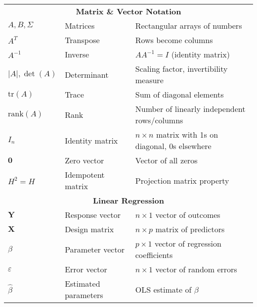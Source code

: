 \documentclass[10pt]{article}
\newcommand{\vect}[1]{\symbf{#1}} %
\begin{document}
\begin{center}
\begin{tabular}{l l l}
    \midrule
    \multicolumn{3}{c}{\textbf{Matrix \& Vector Notation}}                                                                \\
    $A, B, \Sigma$             & Matrices                       & Rectangular arrays of numbers                           \\
    $A^T$                      & Transpose                      & Rows become columns                                     \\
    $A^{-1}$                   & Inverse                        & $AA^{-1} = I$ (identity matrix)                         \\
    $|A|, \det(A)$             & Determinant                    & Scaling factor, invertibility measure                   \\
    $\text{tr}(A)$             & Trace                          & Sum of diagonal elements                                \\
    $\text{rank}(A)$           & Rank                           & Number of linearly independent rows/columns             \\
    $I_n$                      & Identity matrix                & $n \times n$ matrix with 1s on diagonal, 0s elsewhere   \\
    $\vect{0}$                 & Zero vector                    & Vector of all zeros                                     \\
    $H^2 = H$                  & Idempotent matrix              & Projection matrix property                              \\
    \midrule
    \multicolumn{3}{c}{\textbf{Linear Regression}}                                                                        \\
    $\vect{Y}$                 & Response vector                & $n \times 1$ vector of outcomes                         \\
    $\vect{X}$                 & Design matrix                  & $n \times p$ matrix of predictors                       \\
    $\beta$                    & Parameter vector               & $p \times 1$ vector of regression coefficients          \\
    $\varepsilon$              & Error vector                   & $n \times 1$ vector of random errors                    \\
    $\hat{\beta}$              & Estimated parameters           & OLS estimate of $\beta$                                 \\

\end{tabular}
\end{center}
\end{document}
